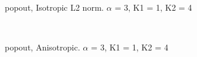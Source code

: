 \begin{figure}
  \centering
     \\
  \caption{popout, Isotropic L2 norm. $\alpha$ = 3, K1 = 1, K2 = 4}
  \label{fig:popout_L2_a4_k11_k24}
\end{figure}

\begin{figure}
  \centering
     \\
  \caption{popout, Anisotropic. $\alpha$ = 3, K1 = 1, K2 = 4}
  \label{fig:popout_ANISO_a4_k11_k24}
\end{figure}